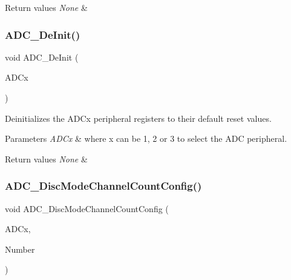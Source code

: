 \begin{DoxyRetVals}{Return values}
{\em None} & \\
\hline
\end{DoxyRetVals}
\mbox{\label{group___a_d_c___exported___functions_ga31fa6bc09de17125e9db2830ce77c09b}} 
\subsubsection{\texorpdfstring{ADC\_DeInit()}{ADC\_DeInit()}}
{\footnotesize\ttfamily void A\+D\+C\+\_\+\+De\+Init (\begin{DoxyParamCaption}\item[{\mbox{\hyperlink{struct_a_d_c___type_def}{A\+D\+C\+\_\+\+Type\+Def}} $\ast$}]{A\+D\+Cx }\end{DoxyParamCaption})}



Deinitializes the A\+D\+Cx peripheral registers to their default reset values. 


\begin{DoxyParams}{Parameters}
{\em A\+D\+Cx} & where x can be 1, 2 or 3 to select the A\+DC peripheral. \\
\hline
\end{DoxyParams}

\begin{DoxyRetVals}{Return values}
{\em None} & \\
\hline
\end{DoxyRetVals}
\mbox{\label{group___a_d_c___exported___functions_ga6eb241ba82d67d1371136c9132083937}} 
\subsubsection{\texorpdfstring{ADC\_DiscModeChannelCountConfig()}{ADC\_DiscModeChannelCountConfig()}}
{\footnotesize\ttfamily void A\+D\+C\+\_\+\+Disc\+Mode\+Channel\+Count\+Config (\begin{DoxyParamCaption}\item[{\mbox{\hyperlink{struct_a_d_c___type_def}{A\+D\+C\+\_\+\+Type\+Def}} $\ast$}]{A\+D\+Cx,  }\item[{uint8\+\_\+t}]{Number }\end{DoxyParamCaption})}



